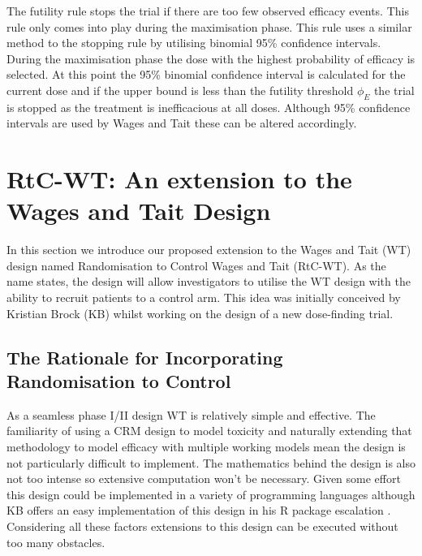 The futility rule stops the trial if there are too few observed efficacy events. This rule only comes into play during the maximisation phase. This rule uses a similar method to the stopping rule by utilising binomial 95\% confidence intervals. During the maximisation phase the dose with the highest probability of efficacy is selected. At this point the 95\% binomial confidence interval is calculated for the current dose and if the upper bound is less than the futility threshold $\phi_E$ the trial is stopped as the treatment is inefficacious at all doses. Although 95\% confidence intervals are used by Wages and Tait these can be altered accordingly. 


 \section{RtC-WT: An extension to the Wages and Tait Design}
 \label{WT:RtC-WT}
 
 In this section we introduce our proposed extension to the Wages and Tait (WT) design named Randomisation to Control Wages and Tait (RtC-WT). As the name states, the design will allow investigators to utilise the WT design with the ability to recruit patients to a control arm. This idea was initially conceived by Kristian Brock (KB) whilst working on the design of a new dose-finding trial.  
 
 \subsection{The Rationale for Incorporating Randomisation to Control}
 \label{WT:Rationale-for-RtC-WT}
 
 
As a seamless phase \RN{1}/\RN{2} design WT is relatively simple and effective. The familiarity of using a CRM design to model toxicity and naturally extending that methodology to model efficacy with multiple working models mean the design is not particularly difficult to implement. The mathematics behind the design is also not too intense so extensive computation won't be necessary. Given some effort this design could be implemented in a variety of programming languages although KB offers an easy implementation of this design in his R package escalation \cite{brockModularApproachDose2020}. Considering all these factors extensions to this design can be executed without too many obstacles.


